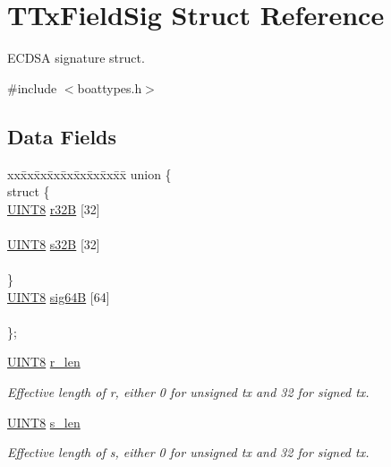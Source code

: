 \hypertarget{struct_t_tx_field_sig}{}\section{T\+Tx\+Field\+Sig Struct Reference}
\label{struct_t_tx_field_sig}


E\+C\+D\+SA signature struct.  




{\ttfamily \#include $<$boattypes.\+h$>$}

\subsection*{Data Fields}
\begin{DoxyCompactItemize}
\item 
\begin{tabbing}
xx\=xx\=xx\=xx\=xx\=xx\=xx\=xx\=xx\=\kill
union \{\\
\>struct \{\\
\>\>\mbox{\hyperlink{boattypes_8h_ab27e9918b538ce9d8ca692479b375b6a}{UINT8}} \mbox{\hyperlink{struct_t_tx_field_sig_acb08684041d47cfe393d93c526cf2b2b}{r32B}} \mbox{[}32\mbox{]}\\
\>\>\\
\>\>\mbox{\hyperlink{boattypes_8h_ab27e9918b538ce9d8ca692479b375b6a}{UINT8}} \mbox{\hyperlink{struct_t_tx_field_sig_a2ca2eee9b55a6b19f664e33950a3c305}{s32B}} \mbox{[}32\mbox{]}\\
\>\>\\
\>\} \\
\>\mbox{\hyperlink{boattypes_8h_ab27e9918b538ce9d8ca692479b375b6a}{UINT8}} \mbox{\hyperlink{struct_t_tx_field_sig_a6ed37aa000b28da3bee862b39e3e86a4}{sig64B}} \mbox{[}64\mbox{]}\\
\>\>\\
\}; \\

\end{tabbing}\item 
\mbox{\hyperlink{boattypes_8h_ab27e9918b538ce9d8ca692479b375b6a}{U\+I\+N\+T8}} \mbox{\hyperlink{struct_t_tx_field_sig_ac004600ddcf7a30d14806ef814ee7893}{r\+\_\+len}}
\begin{DoxyCompactList}\small\item\em Effective length of r, either 0 for unsigned tx and 32 for signed tx. \end{DoxyCompactList}\item 
\mbox{\hyperlink{boattypes_8h_ab27e9918b538ce9d8ca692479b375b6a}{U\+I\+N\+T8}} \mbox{\hyperlink{struct_t_tx_field_sig_a36dbce8d788801d4e5542477c95172bb}{s\+\_\+len}}
\begin{DoxyCompactList}\small\item\em Effective length of s, either 0 for unsigned tx and 32 for signed tx. \end{DoxyCompactList}\end{DoxyCompactItemize}


